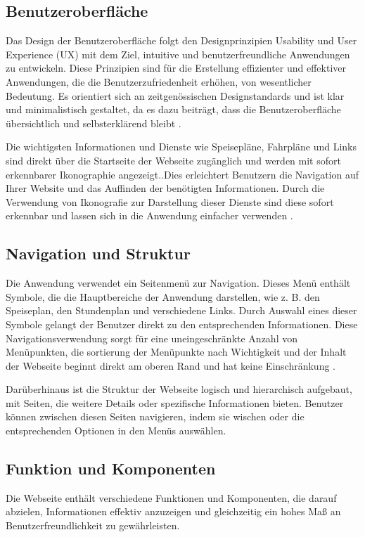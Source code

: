 \subsection{Benutzeroberfläche}
Das Design der Benutzeroberfläche folgt den Designprinzipien Usability und User Experience (UX) mit dem Ziel, intuitive und benutzerfreundliche Anwendungen zu entwickeln\cite{hartmann2017usability}. Diese Prinzipien sind für die Erstellung effizienter und effektiver Anwendungen, die die Benutzerzufriedenheit erhöhen, von wesentlicher Bedeutung\cite{14all}. Es orientiert sich an zeitgenössischen Designstandards und ist klar und minimalistisch gestaltet, da es dazu beiträgt, dass die Benutzeroberfläche übersichtlich und selbsterklärend bleibt \cite{massiveart}.

Die wichtigsten Informationen und Dienste wie Speisepläne, Fahrpläne und Links sind direkt über die Startseite der Webseite zugänglich und werden mit sofort erkennbarer Ikonographie angezeigt..Dies erleichtert Benutzern die Navigation auf Ihrer Website und das Auffinden der benötigten Informationen. Durch die Verwendung von Ikonografie zur Darstellung dieser Dienste sind diese sofort erkennbar und lassen sich in die Anwendung einfacher verwenden \cite{99designs}. 

\subsection{Navigation und Struktur}
Die Anwendung verwendet ein Seitenmenü zur Navigation. Dieses Menü enthält Symbole, die die Hauptbereiche der Anwendung darstellen, wie z. B. den Speiseplan, den Stundenplan und verschiedene Links. Durch Auswahl eines dieser Symbole gelangt der Benutzer direkt zu den entsprechenden Informationen. Diese Navigationsverwendung sorgt für eine uneingeschränkte Anzahl von Menüpunkten, die sortierung der Menüpunkte nach Wichtigkeit und der Inhalt der Webseite beginnt direkt am oberen Rand und hat keine Einschränkung \cite{eology2023}.

 Darüberhinaus ist die Struktur der Webseite logisch und hierarchisch aufgebaut, mit Seiten, die weitere Details oder spezifische Informationen bieten. Benutzer können zwischen diesen Seiten navigieren, indem sie wischen oder die entsprechenden Optionen in den Menüs auswählen.

\subsection{Funktion und Komponenten}
Die Webseite enthält verschiedene Funktionen und Komponenten, die darauf abzielen, Informationen effektiv anzuzeigen und gleichzeitig ein hohes Maß an Benutzerfreundlichkeit zu gewährleisten.

